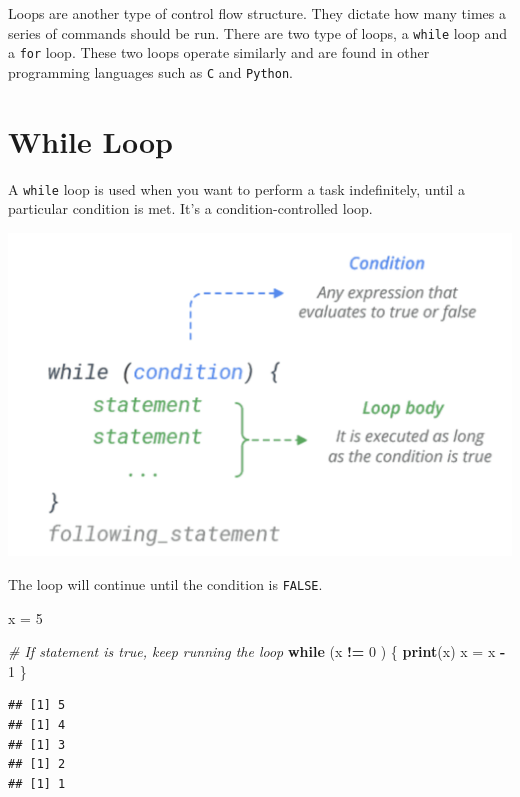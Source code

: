 \documentclass[
]{book}
\newenvironment{Shaded}{\begin{snugshade}}{\end{snugshade}}
\newcommand{\CommentTok}[1]{\textcolor[rgb]{0.56,0.35,0.01}{\textit{#1}}}
\newcommand{\ControlFlowTok}[1]{\textcolor[rgb]{0.13,0.29,0.53}{\textbf{#1}}}
\newcommand{\DecValTok}[1]{\textcolor[rgb]{0.00,0.00,0.81}{#1}}
\newcommand{\KeywordTok}[1]{\textcolor[rgb]{0.13,0.29,0.53}{\textbf{#1}}}
\newcommand{\NormalTok}[1]{#1}
\newcommand{\OperatorTok}[1]{\textcolor[rgb]{0.81,0.36,0.00}{\textbf{#1}}}
\newcommand{\StringTok}[1]{\textcolor[rgb]{0.31,0.60,0.02}{#1}}
\begin{document}
Loops are another type of control flow structure. They dictate how many times a series of commands should be run. There are two type of loops, a \texttt{while} loop and a \texttt{for} loop. These two loops operate similarly and are found in other programming languages such as \texttt{C} and \texttt{Python}.

\hypertarget{while-loop}{%
\section{While Loop}\label{while-loop}}

A \texttt{while} loop is used when you want to perform a task indefinitely, until a particular condition is met. It's a condition-controlled loop.

\begin{center}\includegraphics[width=14.5in]{images/WhileLoop} \end{center}

The loop will continue until the condition is \texttt{FALSE}.

\begin{Shaded}
\begin{Highlighting}[]
\NormalTok{x =}\StringTok{ }\DecValTok{5}

\CommentTok{# If statement is true, keep running the loop }
\ControlFlowTok{while}\NormalTok{ (x }\OperatorTok{!=}\StringTok{ }\DecValTok{0}\NormalTok{ ) \{}
  \KeywordTok{print}\NormalTok{(x)}
\NormalTok{  x =}\StringTok{ }\NormalTok{x }\OperatorTok{-}\StringTok{ }\DecValTok{1}
\NormalTok{\}}
\end{Highlighting}
\end{Shaded}

\begin{verbatim}
## [1] 5
## [1] 4
## [1] 3
## [1] 2
## [1] 1
\end{verbatim}
\end{document}
